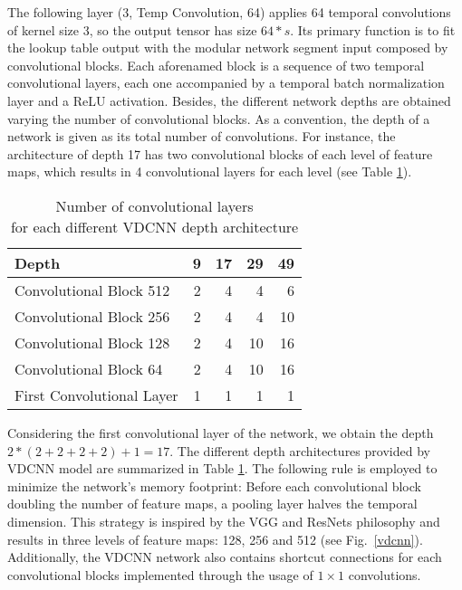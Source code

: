 \documentclass[conference]{IEEEtran}
\newcommand{\ra}[1]{\renewcommand{\arraystretch}{#1}}
\begin{document}
The following layer (3, Temp Convolution, 64) applies 64 temporal convolutions of kernel size 3, so the output tensor has size $64 \ast s$. Its primary function is to fit the lookup table output with the modular network segment input composed by convolutional blocks. Each aforenamed block is a sequence of two temporal convolutional layers,  each one accompanied by a temporal batch normalization layer \cite{ioffe2015batch} and a ReLU activation. Besides, the different network depths are obtained varying the number of convolutional blocks. As a convention,  the depth of a network is given as its total number of convolutions. For instance, the architecture of depth 17 has two convolutional blocks of each level of feature maps, which results in 4 convolutional layers for each level (see Table \ref{depth_vdcnn}).

\begin{table}[htpb]
\caption{Number of convolutional layers\\for each different VDCNN depth architecture}
\label{depth_vdcnn}
\ra{1.3}
\begin{center}
\begin{tabular}{@{}lrrrr@{}}\toprule
Depth          & 9 & 17 & 29 & 49  \\  \midrule
Convolutional Block 512 & 2 & 4 & 4 & 6 \\
Convolutional Block 256 & 2 & 4 & 4 & 10 \\
Convolutional Block 128 & 2 & 4 & 10 & 16 \\
Convolutional Block 64 & 2 & 4 & 10 & 16 \\
First Convolutional Layer & 1 & 1 & 1 & 1 \\
\bottomrule
\end{tabular}
\end{center}
\end{table}

\pagebreak

\noindent 
Considering the first convolutional layer of the network, we obtain the depth $2 \ast (2 + 2 + 2 +2)  + 1 = 17$. The different depth architectures provided by VDCNN model are summarized in Table \ref{depth_vdcnn}. The following rule is employed to minimize the network's memory footprint: Before each convolutional block doubling the number of feature maps, a pooling layer halves the temporal dimension. This strategy is inspired by the VGG and ResNets philosophy and results in three levels of feature maps: 128, 256 and 512 (see Fig.~\ref{vdcnn}). Additionally, the VDCNN network also contains shortcut connections  \cite{he2016deep} for each convolutional blocks implemented through the usage of $1\times1$ convolutions.
\end{document}
